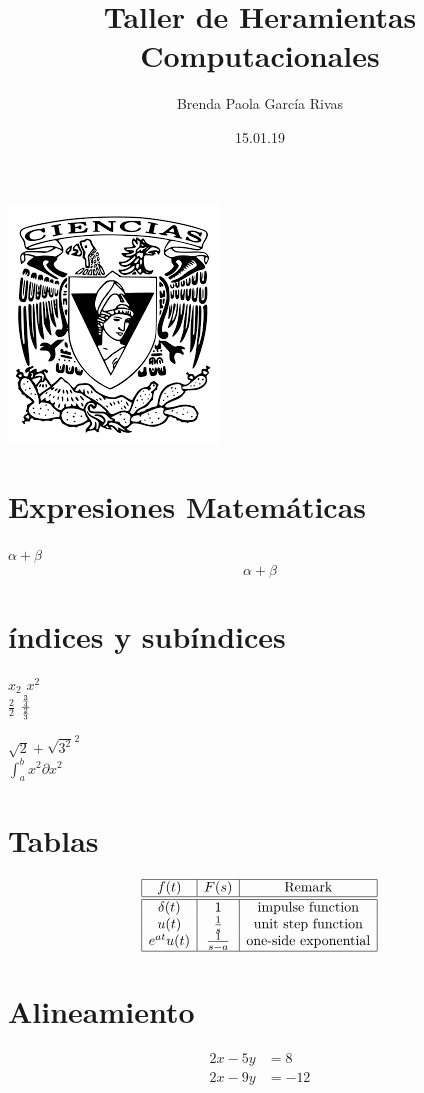 \documentclass{article}
\title{\huge Taller de Heramientas Computacionales}
\author{Brenda Paola García Rivas}
\date{15.01.19}
\begin{document}
	\maketitle
	\begin{center}
	\includegraphics[scale=0.90]{1.png}
	\end{center}
\newpage
\section*{Expresiones Matemáticas}

$\alpha + \beta$\\ %
\[\alpha + \beta\]
\section*{índices y subíndices}
$x_{2}$
$x^{2}$\\

$\frac{2}{2}$
$\frac{\frac{3}{4}}{\frac{2}{3}}\\$

$\sqrt{2} + \sqrt{3^2}^2$\\

$\int_{a}^{b} x^2 \partial x^2$ 


\section*{Tablas}
\[
\begin{array}{|c|c|c|}
\hline
f(t) & F(s) & \mbox{Remark}\\
\hline\hline
\delta(t) & 1 & \mbox{impulse function}\\
u(t) & \frac{1}{s} & \mbox{unit step function}\\
e^{at}u(t) & \frac{1}{s-a} & \mbox{one-side exponential}\\
\hline
\end{array}\]

\section*{Alineamiento}

\begin{align}
2x - 5y &= 8\\
2x - 9y &= -12
\end{align}
\end{document}
